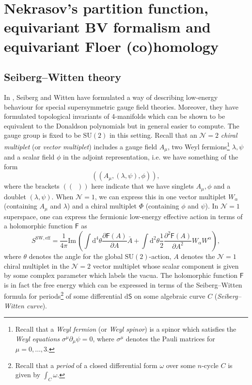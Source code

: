 \documentclass[11pt,colorinlistoftodos]{amsart}
\numberwithin{equation}{subsection}
\theoremstyle{plain}
\theoremstyle{definition}
\theoremstyle{remark}
\newcommand{\dd}{{\mathrm{d}}}
\newcommand{\de}{\partial}
\newcommand{\calN}{\mathcal{N}}
\begin{document}
\section{Nekrasov's partition function, equivariant BV formalism and equivariant Floer (co)homology}
\label{sec:Nekarsov_partition_function_and_equivariant_BV_formalism}


\subsection{Seiberg--Witten theory}
In \cite{SeibergWitten1994,SeibergWitten1994_2}, Seiberg and Witten have formulated a way of describing low-energy behaviour for special supersymmetric gauge field theories. Moreover, they have formulated topological invariants of 4-manifolds which can be shown to be equivalent to the Donaldson polynomials but in general easier to compute. 
The gauge group is fixed to be $\mathrm{SU}(2)$ in this setting.
Recall that an $\calN=2$ \emph{chiral multiplet} (or \emph{vector multiplet}) includes a gauge field $A_\mu$, two Weyl fermions\footnote{Recall that a \emph{Weyl fermion} (or \emph{Weyl spinor}) is a spinor which satisfies the \emph{Weyl equations} $\sigma^\mu\de_\mu\psi=0$, where $\sigma^\mu$ denotes the Pauli matrices for $\mu=0,\ldots,3$.} $\lambda,\psi$ and a scalar field $\phi$ in the adjoint representation, i.e. we have something of the form 
\[
(\!(A_\mu,(\lambda,\psi),\phi)\!),
\]
where the brackets $(\!(\enspace)\!)$ here indicate that we have singlets $A_\mu,\phi$ and a doublet $(\lambda,\psi)$. When $\calN=1$, we can express this in one vector multiplet $W_\alpha$ (containing $A_\mu$ and $\lambda$) and a chiral multiplet $\Phi$ (containing $\phi$ and $\psi$).
In $\calN=1$ superspace, one can express the fermionic low-energy effective action in terms of a holomorphic function $\mathsf{F}$ as 
\begin{equation}
    \label{eq:Seiberg-Witten_action}
    S^\mathrm{SW,eff}=\frac{1}{4\pi}\mathrm{Im}\,\left(\int\dd^4\theta \frac{\de\mathsf{F}(A)}{\de A}\bar A+\int \dd^2\theta\frac{1}{2}\frac{\de^2\mathsf{F}(A)}{\de A^2}W_\alpha W^{\alpha}\right),
\end{equation}
where $\theta$ denotes the angle for the global $\mathrm{SU}(2)$-action, $A$ denotes the $\calN=1$ chiral multiplet in the $\calN=2$ vector multiplet whose scalar component is given by some complex parameter which labels the vacua. The holomorphic function $\mathsf{F}$ is in fact the free energy which can be expressed in terms of the Seiberg--Witten formula for periods\footnote{Recall that a \emph{period} of a closed differential form $\omega$ over some $n$-cycle $C$ is given by $\int_C\omega$.} of some differential $\dd \mathsf{S}$ on some algebraic curve $C$ (\emph{Seiberg--Witten curve}).
\end{document}
